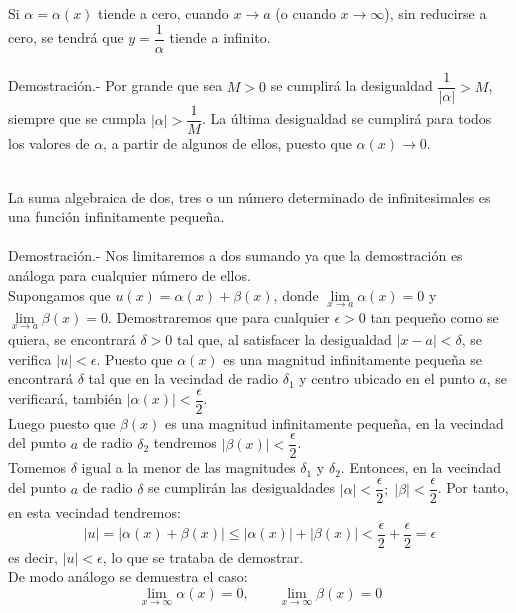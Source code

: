     \begin{teo}
	Si $\alpha = \alpha(x)$ tiende a cero, cuando ${x \to a}$ (o cuando ${x \to \infty}$), sin reducirse a cero, se tendrá que $y=\dfrac{1}{\alpha}$  tiende a infinito.\\\\
	    Demostración.-\; Por grande que sea $M>0$ se cumplirá la desigualdad $\dfrac{1}{|\alpha|}>M$, siempre que se cumpla $|\alpha|>\dfrac{1}{M}$. La última desigualdad se cumplirá para todos los valores de $\alpha$, a partir de algunos de ellos, puesto que $\alpha(x) \to 0.$\\\\
    \end{teo}

    \begin{teo}
	La suma algebraica de dos, tres o un número determinado de infinitesimales es una función infinitamente pequeña.\\\\
	    Demostración.-\; Nos limitaremos a dos sumando ya que la demostración es análoga para cualquier número de ellos.\\
	    Supongamos que $u(x)=\alpha(x) + \beta(x)$, donde $\lim\limits_{x \to a} \alpha(x)=0$ y $\lim\limits_{x \to a} \beta(x)=0$. Demostraremos que para cualquier $\epsilon >0$ tan pequeño como se quiera, se encontrará $\delta >0$ tal que, al satisfacer la desigualdad $|x-a|<\delta$, se verifica $|u|<\epsilon$. Puesto que $\alpha (x)$ es una magnitud infinitamente pequeña se encontrará $\delta$ tal que en la vecindad de radio $\delta_1$ y centro ubicado en el punto $a$, se verificará, también $|\alpha(x)|<\dfrac{\epsilon}{2}$.\\
	    Luego puesto que $\beta (x)$ es una magnitud infinitamente pequeña, en la vecindad del punto $a$ de radio $\delta_2$ tendremos $|\beta(x)|<\dfrac{\epsilon}{2}$.\\
	    Tomemos $\delta$ igual a la menor de las magnitudes $\delta_1$ y $\delta_2$. Entonces, en la vecindad del punto $a$ de radio $\delta$ se cumplirán las desigualdades $|\alpha|<\dfrac{\epsilon}{2}; \; |\beta|<\dfrac{\epsilon}{2}$. Por tanto, en esta vecindad tendremos: $$|u|=|\alpha (x) + \beta (x)|\leq |\alpha (x)| + |\beta (x)| < \dfrac{\epsilon}{2} + \dfrac{\epsilon}{2} = \epsilon$$ es decir, $|u|<\epsilon$, lo que se trataba de demostrar.\\
	    De modo análogo se demuestra el caso: $$\lim\limits_{x \to \infty} \alpha (x)=0, \qquad \lim\limits_{x \to \infty} \beta (x) =0$$\\\\
    \end{teo}

